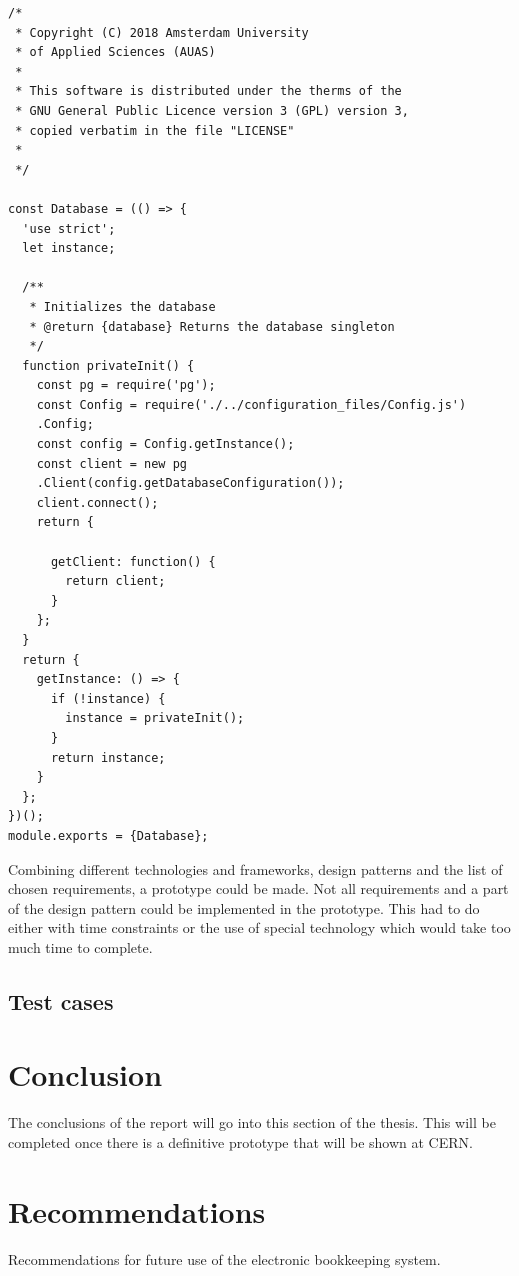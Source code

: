 \documentclass[paper=a4, fontsize=11pt,twoside]{scrartcl}	%
\begin{document}
\begin{lstlisting}[frame=single]
/*
 * Copyright (C) 2018 Amsterdam University 
 * of Applied Sciences (AUAS)
 *
 * This software is distributed under the therms of the
 * GNU General Public Licence version 3 (GPL) version 3,
 * copied verbatim in the file "LICENSE"
 *
 */

const Database = (() => {
  'use strict';
  let instance;

  /**
   * Initializes the database
   * @return {database} Returns the database singleton
   */
  function privateInit() {
    const pg = require('pg');
    const Config = require('./../configuration_files/Config.js')
    .Config;
    const config = Config.getInstance();
    const client = new pg
    .Client(config.getDatabaseConfiguration());
    client.connect();
    return {

      getClient: function() {
        return client;
      }
    };
  }
  return {
    getInstance: () => {
      if (!instance) {
        instance = privateInit();
      }
      return instance;
    }
  };
})();
module.exports = {Database};
\end{lstlisting} 

Combining different technologies and frameworks, design patterns and the list of chosen requirements, a prototype could be made. Not all requirements and a part of the design pattern could be implemented in the prototype. This had to do either with time constraints or the use of special technology which would take too much time to complete.

\newpage
\subsection{Test cases}


\newpage
\section{Conclusion}
The conclusions of the report will go into this section of the thesis. This will be completed once there is a definitive prototype that will be shown at CERN.
\newpage
\section{Recommendations}
Recommendations for future use of the electronic bookkeeping system.
\newpage
\end{document}
